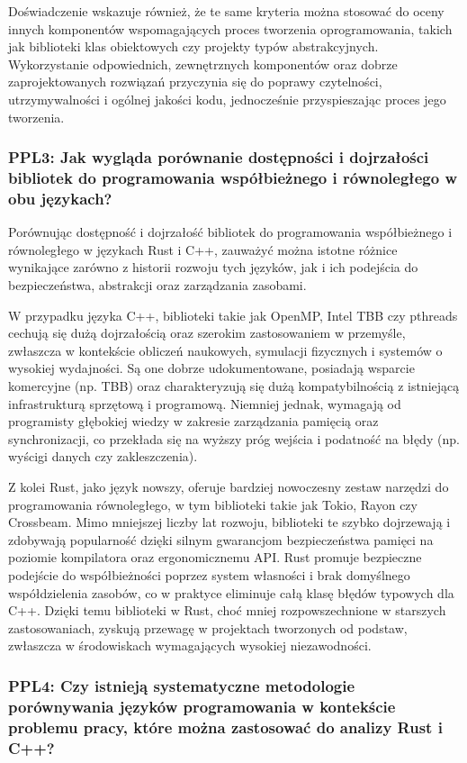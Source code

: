     Doświadczenie wskazuje również, że te same kryteria można stosować do oceny innych komponentów wspomagających proces tworzenia oprogramowania, takich jak biblioteki klas obiektowych czy projekty typów abstrakcyjnych. Wykorzystanie odpowiednich, zewnętrznych komponentów oraz dobrze zaprojektowanych rozwiązań przyczynia się do poprawy czytelności, utrzymywalności i ogólnej jakości kodu, jednocześnie przyspieszając proces jego tworzenia.

\subsubsection{PPL3: Jak wygląda porównanie dostępności i dojrzałości bibliotek do programowania współbieżnego i równoległego w obu językach?}
Porównując dostępność i dojrzałość bibliotek do programowania współbieżnego i równoległego w językach Rust i C++, zauważyć można istotne różnice wynikające zarówno z historii rozwoju tych języków, jak i ich podejścia do bezpieczeństwa, abstrakcji oraz zarządzania zasobami.

W przypadku języka C++, biblioteki takie jak OpenMP, Intel TBB czy pthreads cechują się dużą dojrzałością oraz szerokim zastosowaniem w przemyśle, zwłaszcza w kontekście obliczeń naukowych, symulacji fizycznych i systemów o wysokiej wydajności. Są one dobrze udokumentowane, posiadają wsparcie komercyjne (np. TBB) oraz charakteryzują się dużą kompatybilnością z istniejącą infrastrukturą sprzętową i programową. Niemniej jednak, wymagają od programisty głębokiej wiedzy w zakresie zarządzania pamięcią oraz synchronizacji, co przekłada się na wyższy próg wejścia i podatność na błędy (np. wyścigi danych czy zakleszczenia).

Z kolei Rust, jako język nowszy, oferuje bardziej nowoczesny zestaw narzędzi do programowania równoległego, w tym biblioteki takie jak Tokio, Rayon czy Crossbeam. Mimo mniejszej liczby lat rozwoju, biblioteki te szybko dojrzewają i zdobywają popularność dzięki silnym gwarancjom bezpieczeństwa pamięci na poziomie kompilatora oraz ergonomicznemu API. Rust promuje bezpieczne podejście do współbieżności poprzez system własności  i brak domyślnego współdzielenia zasobów, co w praktyce eliminuje całą klasę błędów typowych dla C++. Dzięki temu biblioteki w Rust, choć mniej rozpowszechnione w starszych zastosowaniach, zyskują przewagę w projektach tworzonych od podstaw, zwłaszcza w środowiskach wymagających wysokiej niezawodności.

\subsubsection{PPL4: Czy istnieją systematyczne metodologie porównywania języków programowania w kontekście problemu pracy, które można zastosować do analizy Rust i C++?}

